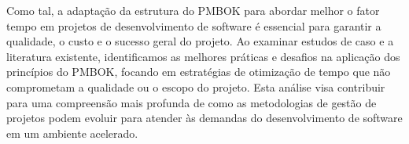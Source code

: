 \documentclass[
	12pt,				%
	oneside,			%
	a4paper,			%
	english,			%
	brazil				%
	]{abntex2unama}
\begin{document}
Como tal, a adaptação da estrutura do PMBOK para abordar melhor o fator tempo em projetos de desenvolvimento de software é essencial para garantir a qualidade, o custo e o sucesso geral do projeto. Ao examinar estudos de caso e a literatura existente, identificamos as melhores práticas e desafios na aplicação dos princípios do PMBOK, focando em estratégias de otimização de tempo que não comprometam a qualidade ou o escopo do projeto. Esta análise visa contribuir para uma compreensão mais profunda de como as metodologias de gestão de projetos podem evoluir para atender às demandas do desenvolvimento de software em um ambiente acelerado.

\postextual



%
%

\end{document}
